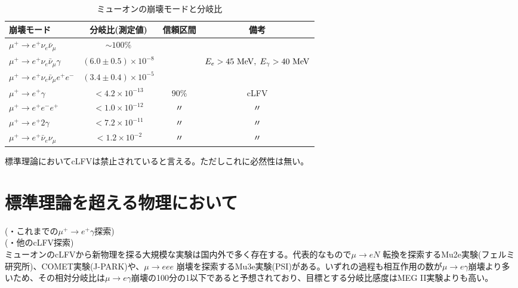 \documentclass[Yonemoto_master.tex]{subfiles}
\begin{document}
\begin{table}[h]
 \centering
  \begin{tabular}{lccc}
   \hline
   崩壊モード & 分岐比(測定値) & 信頼区間 & 備考\\
   \hline \hline
   $\mu^+ \to e^+\nu_e\bar{\nu}_{\mu}$ & $\sim 100 \%$ & \ & \ \\
   $\mu^+ \to e^+\nu_e\bar{\nu}_{\mu}\gamma$ & $(6.0 \pm 0.5) \times 10^{-8} $ & \ & $E_e > 45 \ {\rm MeV},\; E_\gamma > 40 \ {\rm MeV}$ \\
   $\mu^+ \to e^+\nu_e\bar{\nu}_{\mu}e^+e^- $ & $(3.4 \pm 0.4) \times 10^{-5} $ & \ & \ \\
   \hline
   $\mu^+ \to e^+\gamma$ & $< 4.2 \times 10^{-13}$ & $90 \%$ & cLFV \\
   $\mu^+ \to e^+e^-e^+$ & $< 1.0 \times 10^{-12} $ & 〃 & 〃 \\
   $\mu^+ \to e^+2\gamma$ & $< 7.2 \times 10^{-11} $ & 〃 & 〃 \\
   $\mu^+ \to e^+\bar{\nu}_e\nu_{\mu}$ & $< 1.2 \times 10^{-2} $ & 〃 & 〃 \\
   \hline
  \end{tabular}
 \caption{ミューオンの崩壊モードと分岐比 \cite{muon}}
\end{table}
\label{tab: Mu_mode}

\begin{comment}
標準理論における荷電レプトンの相互作用ラグランジアンを書き下すと、
\begin{align}
\mathcal{L} = \ & e\bar{\ell}\gamma^{\mu}{\ell}A_{\mu} \nonumber \\
& -  \frac{g}{\sqrt{2}}(\bar{\nu}_{\ell L}\gamma^{\mu}\ell_L W^+_{\mu} + h.c.) \ \ \ \ (+h.c.は前項のエルミート共役を足すことを意味する) \nonumber \\
& -  \sqrt{g^2+g^{'2}} \{ \bar{\ell}_L\gamma^{\mu}(-\frac{1}{2}+{\rm sin}^2\theta_W)\ell_L + \bar{\ell}_R\gamma^{\mu}{\rm sin}^2\theta_W\ell_R\}Z_{\mu}
- \frac{m_{\ell}}{v}\bar{\ell}\ell H
\end{align}
ここで、$\ell$は荷電レプトン、$m_{\ell}$はその質量、$g、g'$はそれぞれ標準模型のSU(2)、U(1)相互作用に対応する結合定数、$\theta_W$はワインバーグ角、$Z、W、H$はゲージボソンとヒッグス粒子である。
\end{comment}



標準理論においてcLFVは禁止されていると言える。ただしこれに必然性は無い。



\section{標準理論を超える物理において}
(・これまでの$\mu^+ \to e^+ \gamma$探索) \\
(・他のcLFV探索) \\
ミューオンのcLFVから新物理を探る大規模な実験は国内外で多く存在する。代表的なもので$\mu \to eN$ 転換を探索するMu2e実験(フェルミ研究所)、COMET実験(J-PARK)や、$\mu \to eee$ 崩壊を探索するMu3e実験(PSI)がある。いずれの過程も相互作用の数が$\mu \to e\gamma$崩壊より多いため、その相対分岐比は$\mu \to e\gamma$崩壊の100分の1以下であると予想されており、目標とする分岐比感度はMEG II実験よりも高い。
\end{document}
